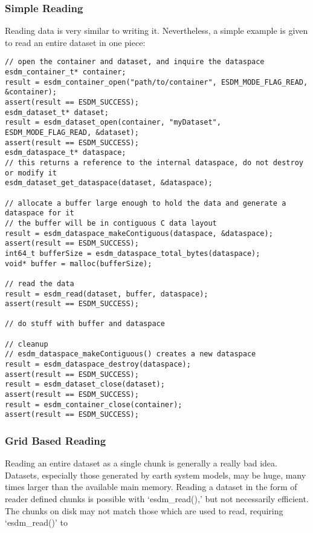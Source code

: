 \subsubsection{Simple Reading}

Reading data is very similar to writing it. Nevertheless, a simple
example is given to read an entire dataset in one piece:

\begin{lstlisting}
// open the container and dataset, and inquire the dataspace
esdm_container_t* container;
result = esdm_container_open("path/to/container", ESDM_MODE_FLAG_READ, &container);
assert(result == ESDM_SUCCESS);
esdm_dataset_t* dataset;
result = esdm_dataset_open(container, "myDataset", ESDM_MODE_FLAG_READ, &dataset);
assert(result == ESDM_SUCCESS);
esdm_dataspace_t* dataspace;
// this returns a reference to the internal dataspace, do not destroy or modify it
esdm_dataset_get_dataspace(dataset, &dataspace);  

// allocate a buffer large enough to hold the data and generate a dataspace for it
// the buffer will be in contiguous C data layout
result = esdm_dataspace_makeContiguous(dataspace, &dataspace);  
assert(result == ESDM_SUCCESS);
int64_t bufferSize = esdm_dataspace_total_bytes(dataspace);
void* buffer = malloc(bufferSize);

// read the data
result = esdm_read(dataset, buffer, dataspace);
assert(result == ESDM_SUCCESS);

// do stuff with buffer and dataspace

// cleanup
// esdm_dataspace_makeContiguous() creates a new dataspace
result = esdm_dataspace_destroy(dataspace); 
assert(result == ESDM_SUCCESS);
result = esdm_dataset_close(dataset);
assert(result == ESDM_SUCCESS);
result = esdm_container_close(container);
assert(result == ESDM_SUCCESS);
\end{lstlisting}

\subsubsection{Grid Based Reading}

Reading an entire dataset as a single chunk is generally a really bad
idea. Datasets, especially those generated by earth system models, may
be huge, many times larger than the available main memory. Reading a
dataset in the form of reader defined chunks is possible with
`esdm\_read(),' but not necessarily efficient. The chunks on disk may
not match those which are used to read, requiring `esdm\_read()' to

